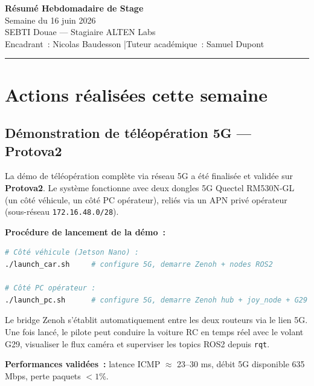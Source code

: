 \documentclass[a4paper,11pt]{article}
\begin{document}
\begin{center}
{\Large\bfseries\color{primary} Résumé Hebdomadaire de Stage}\\[0.3cm]
{\large Semaine du 16 juin 2026}\\[0.15cm]
{\normalsize SEBTI Douae — Stagiaire ALTEN Labs}\\[0.1cm]
{\small\color{darkgray} Encadrant~: Nicolas Baudesson \quad|\quad Tuteur académique~: Samuel Dupont}
\end{center}
\vspace{0.4cm}
\hrule
\vspace{0.5cm}

\section{Actions réalisées cette semaine}

\subsection{Démonstration de téléopération 5G — Protova2}

La démo de téléopération complète via réseau 5G a été finalisée et validée sur
\textbf{Protova2}. Le système fonctionne avec deux dongles 5G Quectel RM530N-GL
(un côté véhicule, un côté PC opérateur), reliés via un APN privé opérateur
(sous-réseau \texttt{172.16.48.0/28}).

\textbf{Procédure de lancement de la démo~:}
\begin{lstlisting}[language=bash]
# Côté véhicule (Jetson Nano) :
./launch_car.sh     # configure 5G, demarre Zenoh + nodes ROS2

# Côté PC opérateur :
./launch_pc.sh      # configure 5G, demarre Zenoh hub + joy_node + G29
\end{lstlisting}

Le bridge Zenoh s'établit automatiquement entre les deux routeurs via le lien 5G.
Une fois lancé, le pilote peut conduire la voiture RC en temps réel avec le volant
G29, visualiser le flux caméra et superviser les topics ROS2 depuis \texttt{rqt}.

\begin{tcolorbox}[colback=lightgreen, colframe=success, left=4pt, right=4pt,
  top=3pt, bottom=3pt]
\textbf{Performances validées~:} latence ICMP $\approx$ 23--30 ms, débit 5G
disponible 635 Mbps, perte paquets $< 1$\%.
\end{tcolorbox}
\end{document}
